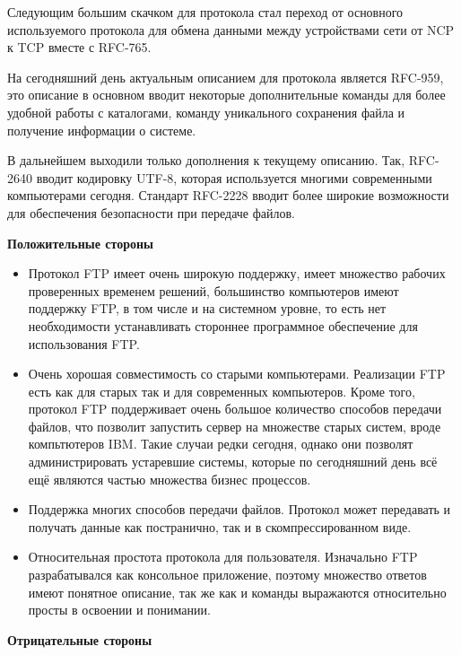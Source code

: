 \documentclass[a4paper,14pt]{extarticle}
\begin{document}
Следующим большим скачком для протокола стал переход от основного используемого
протокола для обмена данными между устройствами сети от NCP к TCP вместе с 
RFC-765. 

На сегодняшний день актуальным описанием для протокола является RFC-959, это описание
в основном вводит некоторые дополнительные команды для более удобной работы с каталогами, 
команду уникального сохранения файла и получение информации о системе.

В дальнейшем выходили только дополнения к текущему описанию. Так, RFC-2640 вводит 
кодировку UTF-8, которая используется многими современными компьютерами сегодня.
Стандарт RFC-2228 вводит более широкие возможности для обеспечения безопасности
при передаче файлов.

\textbf{Положительные стороны}\\
\begin{itemize}
\item Протокол FTP имеет очень широкую поддержку, имеет множество рабочих проверенных
временем решений, большинство компьютеров имеют поддержку FTP, в том числе
и на системном уровне, то есть нет необходимости устанавливать стороннее программное
обеспечение для использования FTP. 
\item Очень хорошая совместимость со старыми компьютерами. Реализации FTP есть как
для старых так и для современных компьютеров. Кроме того, протокол FTP поддерживает
очень большое количество способов передачи файлов, что позволит запустить сервер
на множестве старых систем, вроде компьтютеров IBM. Такие случаи редки сегодня, 
однако они позволят администрировать устаревшие системы, которые по сегодняшний день
всё ещё являются частью множества бизнес процессов.
\item Поддержка многих способов передачи файлов. Протокол может передавать и получать данные 
как постранично, так и в скомпрессированном виде. 
\item Относительная простота протокола для пользователя. Изначально FTP разрабатывался
как консольное приложение, поэтому множество ответов имеют понятное описание, так 
же как и команды выражаются относительно просты в освоении и понимании. 
\end{itemize}
\textbf{Отрицательные стороны}\\
\end{document}
